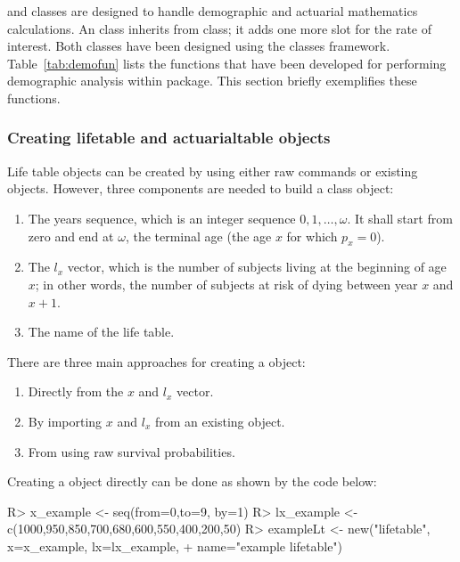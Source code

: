 \documentclass[nojss]{jss}
\begin{document}
 and  classes are designed to handle demographic and actuarial mathematics calculations. An  class inherits
from  class; it adds one more slot for the rate
of interest. Both classes have been designed using the  
classes framework.\\
Table~\ref{tab:demofun} lists the functions that have been developed for performing
demographic analysis within  package. This section
briefly exemplifies these functions.

\subsubsection{Creating lifetable and actuarialtable objects}\label{sss:creating}
Life table objects can be created by using either raw  commands or existing  objects.
However, three components are needed to build a  class object:
\begin{enumerate}
	\item The years sequence, which is an integer sequence $0,1,\ldots, \omega$. It shall 
	start from zero and end at $\omega$, the terminal age (the age $x$
	for which $p_x=0$).
	\item The $l_x$ vector, which is the number of subjects living at the beginning
	of age $x$; in other words, the number of subjects at risk of dying between year
	$x$ and $x+1$.
	\item The name of the life table.
\end{enumerate}

There are three main approaches for creating a  object:
\begin{enumerate}
	\item Directly from the $x$ and $l_x$ vector.
	\item By importing $x$ and $l_x$ from an existing  object.
	\item From using raw survival probabilities.
\end{enumerate}

Creating a  object directly can be done as shown by the code
below:

\begin{Schunk}
\begin{Sinput}
R> x_example <- seq(from=0,to=9, by=1)
R> lx_example <- c(1000,950,850,700,680,600,550,400,200,50)
R> exampleLt <- new("lifetable", x=x_example, lx=lx_example, 
+  		name="example lifetable")
\end{Sinput}
\end{Schunk}
\end{document}
